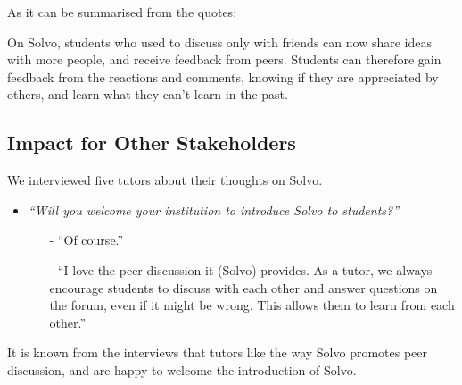 \documentclass[a4paper]{article}
\begin{document}
    As it can be summarised from the quotes:

    On Solvo, students who used to discuss only with friends can now share ideas with more people, and receive feedback from peers.
    Students can therefore gain feedback from the reactions and comments, knowing if they are appreciated by others,
    and learn what they can't learn in the past.

    \subsection*{Impact for Other Stakeholders}

    We interviewed five tutors about their thoughts on Solvo.

    \begin{itemize}
        \item \textit{``Will you welcome your institution to introduce Solvo to students?''}
        \begin{itemize}
            \item[-] ``Of course.''
            \item[-] ``I love the peer discussion it (Solvo) provides.
            As a tutor, we always encourage students to discuss with each other and answer questions on the forum, even if it might be wrong.
            This allows them to learn from each other.''
        \end{itemize}
    \end{itemize}

    It is known from the interviews that tutors like the way Solvo promotes peer discussion, and are happy to welcome the introduction of Solvo.
\end{document}
